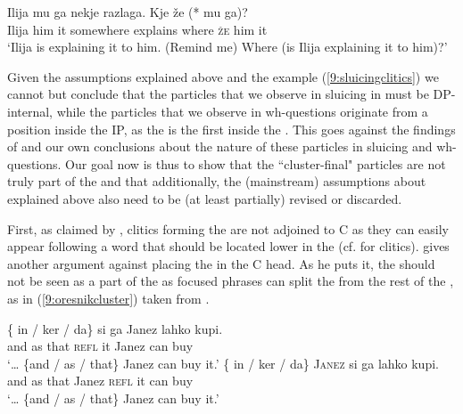 \documentclass[output=paper,modfonts,newtxmath,hidelinks]{langscibook}
\begin{document}
\begin{exe}
\ex \label{9:sluicingclitics}
\gll Ilija mu ga nekje razlaga. Kje že (*\hspace{-2pt} mu ga)?\\
 	Ilija him it somewhere explains where \textsc{že} {} him it\\
 \trans `Ilija is explaining it to him. (Remind me) Where (is Ilija  explaining it to him)?'
\end{exe}

\noindent Given the assumptions explained above and the example (\ref{9:sluicingclitics}) we cannot but conclude that the particles that we observe in sluicing in  must be DP-internal, while the particles that we observe in wh-questions originate from a position inside the IP, as the  is the first  inside the . This goes against the findings of \cite{marusicetal2015} and our own conclusions about the nature of these particles in sluicing and wh-questions. Our goal now is thus to show that the ``cluster-final" particles are not truly part of the  and that additionally, the (mainstream) assumptions about  explained above also need to be (at least partially) revised or discarded.

First, as claimed by \cite{marusic2008clitics}, clitics forming the  are not adjoined to C as they can easily appear following a word that should be located lower in the  (cf. \citealt{Boskovic2001NatureSyntaxPhonology} for  clitics). \cite{oresnik1985naniz} gives another argument against placing the  in the C head. As he puts it, the  should not be seen as a part of the  as focused phrases can split the  from the rest of the , as in (\ref{9:oresnikcluster}) taken from \cite{oresnik1985naniz}.

\begin{exe}
\ex \begin{xlist}
\ex \gll {\dots} \{\hspace{-2pt} in / ker / da\} si ga Janez lahko kupi.\\
	{} {} and {} as {} that 	\textsc{refl} it Janez can buy\\
\trans   `{\dots} \{and / as / that\} Janez can buy it.'
\ex \label{9:oresnikcluster}
\gll	{\dots} \{\hspace{-2pt} in / ker / da\} \textsc{Janez} si ga lahko kupi.\\
	{} {} and {} as {} that Janez \textsc{refl} it can buy\\
\trans `{\dots} \{and / as / that\} Janez can buy it.'
\end{xlist}\end{exe}
\end{document}
